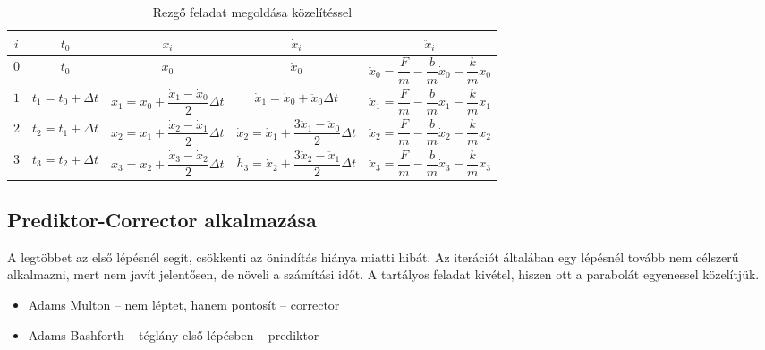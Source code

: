 \documentclass[../../main.tex]{subfiles}
\begin{document}
\bgroup
\def\arraystretch{2}
\setlength{\arrayrulewidth}{1pt}
\begin{table}[H]
  \small
  \centering\begin{tabular}{|*{5}{c|}}
    \hline
    \rowcolor{yellow!70!black}
    $i$ & $t_0$                  & $x_i$                                                 & $\dot x_i$                                                         & $\ddot x_i$
    \\ \hline
    $0$ & $t_0$                  & $x_0$                                                 & $\dot x_0$                                                         & $\ddot x_0 = \dfrac{F}{m} - \dfrac{b}{m} \dot x_0 - \dfrac{k}{m} x_0$
    \\  \rowcolor{gray!10}
    $1$ & $t_1 = t_0 + \Delta t$ & $x_1 = x_0 + \dfrac{\dot x_1 - \dot x_0}{2} \Delta t$ & $\dot x_1 = \dot x_0 + \ddot x_0 \Delta t$                         & $\ddot x_1 = \dfrac{F}{m} - \dfrac{b}{m} \dot x_1 - \dfrac{k}{m} x_1$
    \\
    $2$ & $t_2 = t_1 + \Delta t$ & $x_2 = x_1 + \dfrac{\dot x_2 - \dot x_1}{2} \Delta t$ & $\dot x_2 = \dot x_1 + \dfrac{3\ddot x_1 - \ddot x_0}{2} \Delta t$ & $\ddot x_2 = \dfrac{F}{m} - \dfrac{b}{m} \dot x_2 - \dfrac{k}{m} x_2$
    \\  \rowcolor{gray!10}
    $3$ & $t_3 = t_2 + \Delta t$ & $x_3 = x_2 + \dfrac{\dot x_3 - \dot x_2}{2} \Delta t$ & $\dot h_3 = \dot x_2 + \dfrac{3\ddot x_2 - \ddot x_1}{2} \Delta t$ & $\ddot x_3 = \dfrac{F}{m} - \dfrac{b}{m} \dot x_3 - \dfrac{k}{m} x_3$
    \\ \hline
  \end{tabular}
  \caption{Rezgő feladat megoldása közelítéssel}
  \label{fig:int2}
\end{table}
\egroup

\subsection{Prediktor-Corrector alkalmazása}

A legtöbbet az első lépésnél segít, csökkenti az önindítás hiánya miatti hibát.
Az iterációt általában egy lépésnél tovább nem célszerű alkalmazni, mert nem
javít jelentősen, de növeli a számítási időt. A tartályos feladat kivétel,
hiszen ott a parabolát egyenessel közelítjük.
\begin{itemize}
  \item Adams Multon -- nem léptet, hanem pontosít -- corrector
  \item Adams Bashforth -- téglány első lépésben -- prediktor
\end{itemize}
\end{document}
